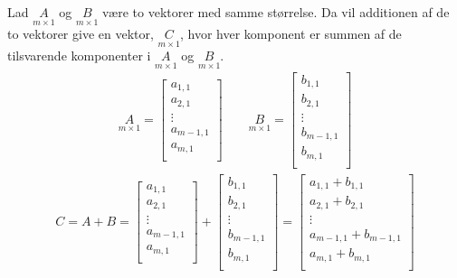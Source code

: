 \begin{defn}
Lad $\underset{m \times 1}{A}$ og $\underset{m \times 1}{B}$ være to vektorer med samme størrelse. Da vil additionen af de to vektorer give en vektor, $\underset{m \times 1}{C}$, hvor hver komponent er summen af de tilsvarende komponenter i $\underset{m \times 1}{A}$ og $\underset{m \times 1}{B}$.
\begin{align*}
\underset{m \times 1}{A} = 
\begin{bmatrix}
a_{1,1}\\
a_{2,1}\\
\vdots \\
a_{m-1,1}\\
a_{m,1} \\
\end{bmatrix}
\qquad
\underset{m \times 1}{B} = 
\begin{bmatrix}
b_{1,1}\\
b_{2,1}\\
\vdots \\
b_{m-1,1}\\
b_{m,1} \\
\end{bmatrix}
\end{align*} 
\begin{align*}
C=A+B=
\begin{bmatrix}
a_{1,1}\\
a_{2,1}\\
\vdots \\
a_{m-1,1}\\
a_{m,1} \\
\end{bmatrix}
+
\begin{bmatrix}
b_{1,1}\\
b_{2,1}\\
\vdots \\
b_{m-1,1}\\
b_{m,1} \\
\end{bmatrix}
=
\begin{bmatrix}
a_{1,1}+b_{1,1}\\
a_{2,1}+b_{2,1}\\
\vdots \\
a_{m-1,1}+b_{m-1,1}\\
a_{m,1}+b_{m,1} \\
\end{bmatrix}
\end{align*}
\end{defn}
